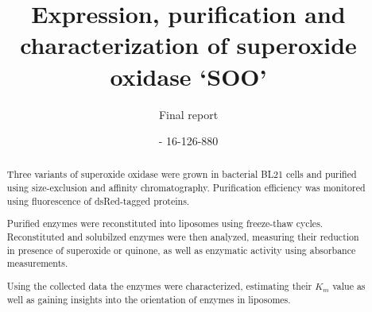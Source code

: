 \documentclass[a4paper,overfullrule=true]{scrartcl}
\title{Expression, purification and characterization of superoxide oxidase `SOO'}
\subtitle{Final report}
\author{\maillink{michael.senn@students.unibe.ch}{Michael Senn} - 16-126-880}
\date{\printdate}
\begin{document}
\maketitle

\begin{abstract}
	Three variants of superoxide oxidase were grown in bacterial BL21 cells
	and purified using size-exclusion and affinity chromatography.
	Purification efficiency was monitored using fluorescence of
	dsRed-tagged proteins.

	Purified enzymes were reconstituted into liposomes using freeze-thaw
	cycles. Reconstituted and solubilzed enzymes were then analyzed,
	measuring their reduction in presence of superoxide or quinone, as well
	as enzymatic activity using absorbance measurements.

	Using the collected data the enzymes were characterized, estimating
	their $K_m$ value as well as gaining insights into the orientation of
	enzymes in liposomes.
\end{abstract}











\newpage


\end{document}
